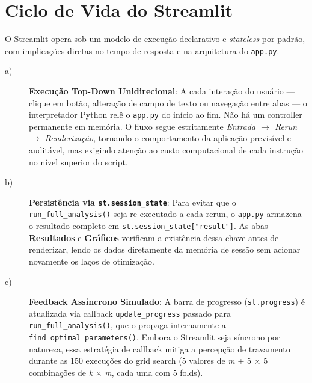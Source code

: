 \begin{description}
\end{description}

\section{Ciclo de Vida do Streamlit}

O Streamlit opera sob um modelo de execução declarativo e \textit{stateless} por padrão,
com implicações diretas no tempo de resposta e na arquitetura do \texttt{app.py}.

\begin{description}

\item[a)] \textbf{Execução Top-Down Unidirecional}: A cada interação do usuário — clique
em botão, alteração de campo de texto ou navegação entre abas — o interpretador Python
relê o \texttt{app.py} do início ao fim. Não há um controller permanente em memória.
O fluxo segue estritamente \textit{Entrada $\rightarrow$ Rerun $\rightarrow$ Renderização},
tornando o comportamento da aplicação previsível e auditável, mas exigindo atenção ao
custo computacional de cada instrução no nível superior do script.

\item[b)] \textbf{Persistência via \texttt{st.session\_state}}: Para evitar que o
\texttt{run\_full\_analysis()} seja re-executado a cada rerun, o \texttt{app.py}
armazena o resultado completo em \texttt{st.session\_state["result"]}. As abas
\textbf{Resultados} e \textbf{Gráficos} verificam a existência dessa chave antes de
renderizar, lendo os dados diretamente da memória de sessão sem acionar novamente os
laços de otimização.

\item[c)] \textbf{Feedback Assíncrono Simulado}: A barra de progresso
(\texttt{st.progress}) é atualizada via callback \texttt{update\_progress} passado para
\texttt{run\_full\_analysis()}, que o propaga internamente a
\texttt{find\_optimal\_parameters()}. Embora o Streamlit seja síncrono por natureza, essa
estratégia de callback mitiga a percepção de travamento durante as 150 execuções do grid
search (5 valores de \textit{m} + 5 $\times$ 5 combinações de \textit{k} $\times$
\textit{m}, cada uma com 5 folds).

\end{description}

